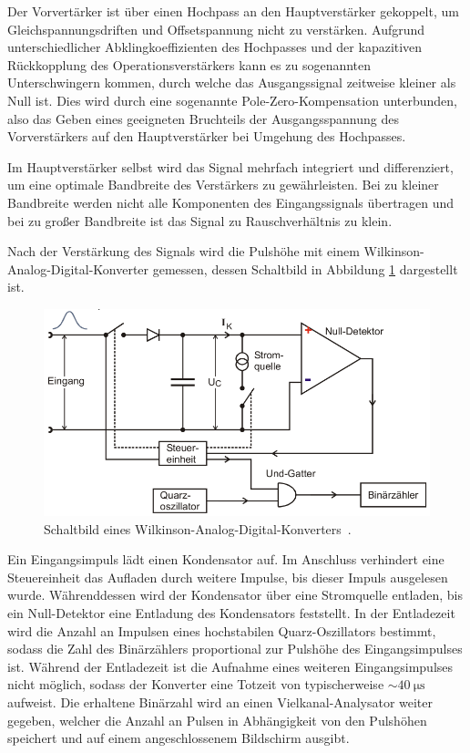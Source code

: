 Der Vorvertärker ist über einen Hochpass an den Hauptverstärker gekoppelt, um Gleichspannungsdriften
und Offsetspannung nicht zu verstärken. Aufgrund unterschiedlicher Abklingkoeffizienten des
Hochpasses und der kapazitiven Rückkopplung des Operationsverstärkers kann es zu sogenannten
Unterschwingern kommen, durch welche das Ausgangssignal zeitweise kleiner als Null ist. Dies
wird durch eine sogenannte Pole-Zero-Kompensation unterbunden, also das Geben eines geeigneten
Bruchteils der Ausgangsspannung des Vorverstärkers auf den Hauptverstärker bei Umgehung
des Hochpasses.

Im Hauptverstärker selbst wird das Signal mehrfach integriert und differenziert,
um eine optimale Bandbreite des Verstärkers zu gewährleisten. Bei zu kleiner Bandbreite
werden nicht alle Komponenten des Eingangssignals übertragen und bei zu großer Bandbreite
ist das Signal zu Rauschverhältnis zu klein.

Nach der Verstärkung des Signals wird die Pulshöhe mit einem Wilkinson-Analog-Digital-Konverter
gemessen, dessen Schaltbild in Abbildung \ref{fig:Wilkinson-Analog-Digital-Konverter} dargestellt ist.
\begin{figure}
	\centering
	\includegraphics[width=.8\textwidth]{images/Wilkinson-AD-Konverter.pdf}
	\caption{Schaltbild eines Wilkinson-Analog-Digital-Konverters~\cite[21]{anleitung}.}
	\label{fig:Wilkinson-Analog-Digital-Konverter}
\end{figure}
Ein Eingangsimpuls lädt einen Kondensator auf. Im Anschluss verhindert eine Steuereinheit
das Aufladen durch weitere Impulse, bis dieser Impuls ausgelesen wurde.
Währenddessen wird der Kondensator über eine Stromquelle entladen, bis ein Null-Detektor eine
Entladung des Kondensators feststellt. In der Entladezeit wird die Anzahl an Impulsen eines
hochstabilen Quarz-Oszillators bestimmt, sodass die Zahl des Binärzählers proportional zur
Pulshöhe des Eingangsimpulses ist.
Während der Entladezeit ist die Aufnahme eines weiteren Eingangsimpulses nicht möglich,
sodass der Konverter eine Totzeit von typischerweise $\sim \SI{40}{\micro\second}$ aufweist.
Die erhaltene Binärzahl wird an einen Vielkanal-Analysator weiter gegeben, welcher
die Anzahl an Pulsen in Abhängigkeit von den Pulshöhen speichert und auf einem angeschlossenem
Bildschirm ausgibt.

